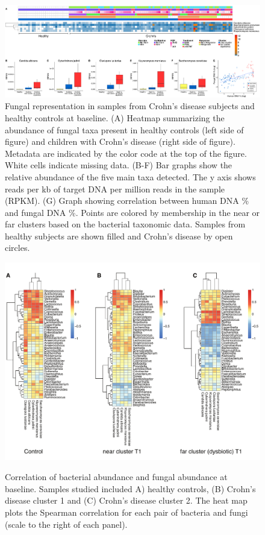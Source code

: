 \begin{figure}
\centering
\includegraphics[scale=0.23,trim=0 0 0 0,clip]{Figure/F23_Fugus.pdf}
\caption[Fungal representation in samples from Crohn's disease subjects and healthy controls at baseline]{Fungal representation in samples from Crohn's disease subjects and healthy controls at baseline.
(A) Heatmap summarizing the abundance of fungal taxa present in healthy controls (left side of figure) and children with Crohn's disease (right side of figure). Metadata are indicated by the color code at the top of the figure. White cells indicate missing data.
(B-F) Bar graphs show the relative abundance of the five main taxa detected. The y axis shows reads per kb of target DNA per million reads in the sample (RPKM).
(G) Graph showing correlation between human DNA \% and fungal DNA \%. Points are colored by membership in the near or far clusters based on the bacterial taxonomic data. Samples from healthy subjects are shown filled and Crohn's disease by open circles. }
\label{F23_Fugus}
\end{figure}




\begin{figure}[p]
	\centering
	{\includegraphics[scale=0.5,trim=0 0 0 0,clip]{Figure/F2S3_taxa_fungi_correlation.pdf}}
	\caption[Correlation of bacterial abundance and fungal abundance at baseline]{Correlation of bacterial abundance and fungal abundance at baseline. Samples studied included A) healthy controls, (B) Crohn's disease cluster 1 and (C) Crohn's disease cluster 2. The heat map plots the Spearman correlation for each pair of bacteria and fungi (scale to the right of each panel).
	}
	\label{F2S3_taxa_fungi_correlation}
\end{figure}



